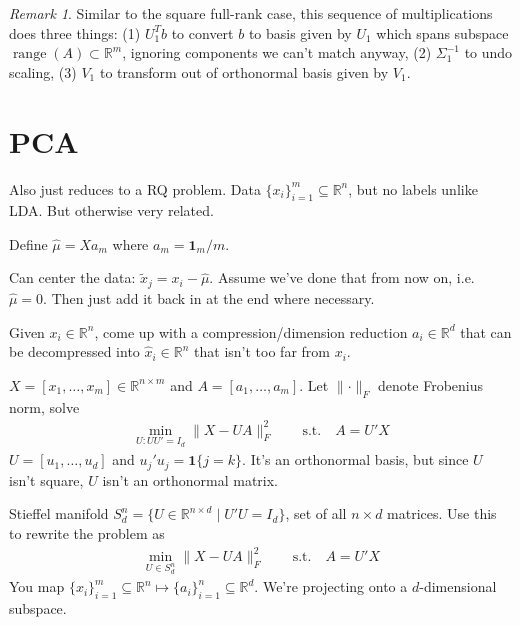 \documentclass[12pt]{book}
\numberwithin{equation}{section} %
\theoremstyle{plain}
\newtheorem{prop}[thm]{Proposition}
\theoremstyle{definition}
\theoremstyle{remark}
\newtheorem*{rmk}{Remark}
\newcommand{\R}{\mathbb{R}}
\newcommand{\Rn}{\mathbb{R}^n}
\newcommand{\Rm}{\mathbb{R}^m}
\newcommand{\Rmn}{\mathbb{R}^{m\times n}}
\newcommand{\range}{\operatorname{range}}
\begin{document}
\begin{rmk}
Similar to the square full-rank case, this sequence of multiplications
does three things:
(1) $U_1^Tb$ to convert $b$ to basis given by $U_1$ which spans
subspace $\range(A)\subset \Rm$, ignoring components we can't
match anyway, (2) $\Sigma_1^{-1}$ to undo scaling, (3) $V_1$ to
transform out of orthonormal basis given by $V_1$.
\end{rmk}










\clearpage
\section{PCA}

Also just reduces to a RQ problem.
Data $\{x_i\}_{i=1}^m\subseteq\Rn$, but no labels unlike LDA. But
otherwise very related.

Define $\hat{\mu}=Xa_m$ where $a_m = \mathbf{1}_m/m$.

Can center the data: $\tilde{x}_j=x_i-\hat{\mu}$.
Assume we've done that from now on, i.e. $\hat{\mu}=0$.
Then just add it back in at the end where necessary.

Given $x_i\in \R^n$, come up with a compression/dimension reduction
$a_i\in\R^d$ that can be decompressed into $\hat{x}_i\in\R^n$ that isn't
too far from $x_i$.

$X=[x_1,\ldots,x_m]\in\R^{n\times m}$ and $A=[a_1,\ldots,a_m]$.
Let $\lVert\cdot\rVert_F$ denote Frobenius norm, solve
\begin{align*}
  \min_{U: UU'=I_d}
  \lVert X-UA\rVert_F^2
  \qquad\text{s.t.}\quad
  A=U'X
\end{align*}
$U=[u_1,\ldots,u_d]$ and $u_j'u_j=\mathbf{1}\{j=k\}$.
It's an orthonormal basis, but since $U$ isn't square, $U$ isn't an
orthonormal matrix.

Stieffel manifold $S_d^n = \{U\in\R^{n\times d}\;|\;U'U=I_d\}$, set of
all $n\times d$ matrices.
Use this to rewrite the problem as
\begin{align*}
  \min_{U\in S_d^n}
  \lVert X-UA\rVert_F^2
  \qquad\text{s.t.}\quad
  A=U'X
\end{align*}
You map
$\{x_i\}_{i=1}^m\subseteq\Rn \mapsto \{a_i\}_{i=1}^n\subseteq\R^d$.
We're projecting onto a $d$-dimensional subspace.
\end{document}
